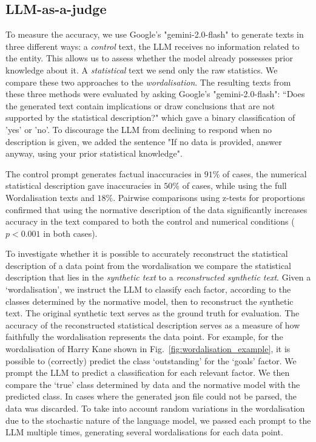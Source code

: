 \documentclass{article}
\begin{document}
\subsection{LLM-as-a-judge}
To measure the accuracy, we use Google’s "gemini-2.0-flash" to generate texts in three different ways: a {\it control} text, the LLM receives no information related to the entity. This allows us to assess whether the model already possesses prior knowledge about it. A {\it statistical} text we send only the raw statistics. We compare these two approaches to the {\it wordalisation}. The resulting texts from these three methods were evaluated by asking Google’s "gemini-2.0-flash": “Does the generated text contain implications or draw conclusions that are not supported by the statistical description?" which gave a binary classification of 'yes' or 'no'. To discourage the LLM from declining to respond when no description is given, we added the sentence "If no data is provided, answer anyway, using your prior statistical knowledge". 

 The control prompt generates factual inaccuracies in $91\%$ of cases, the numerical statistical description gave inaccuracies in $50\%$ of cases, while using the full Wordalisation texts and $18 \%$. Pairwise comparisons using z-tests for proportions confirmed that using the normative description of the data significantly increases accuracy in the text compared to both the control and numerical conditions ($p < 0.001$ in both cases).

 To investigate whether it is possible to accurately reconstruct the statistical description of a data point from the wordalisation we compare the statistical description that lies in the {\it synthetic text} to a {\it reconstructed synthetic text}. Given a `wordalisation', we instruct the LLM to classify each factor, according to the classes determined by the normative model, then to reconstruct the synthetic text. The original synthetic text serves as the ground truth for evaluation. The accuracy of the reconstructed statistical description serves as a measure of how faithfully the wordalisation represents the data point. For example, for the wordalisation of Harry Kane shown in Fig.~\ref{fig:wordalisation_example}, it is possible to (correctly) predict the class `outstanding' for the `goals' factor. We prompt the LLM to predict a classification for each relevant factor. We then compare the `true' class determined by data and the normative model with the predicted class. In cases where the generated json file could not be parsed, the data was discarded. To take into account random variations in the wordalisation due to the stochastic nature of the language model, we passed each prompt to the LLM multiple times, generating several wordalisations for each data point. 
\end{document}
